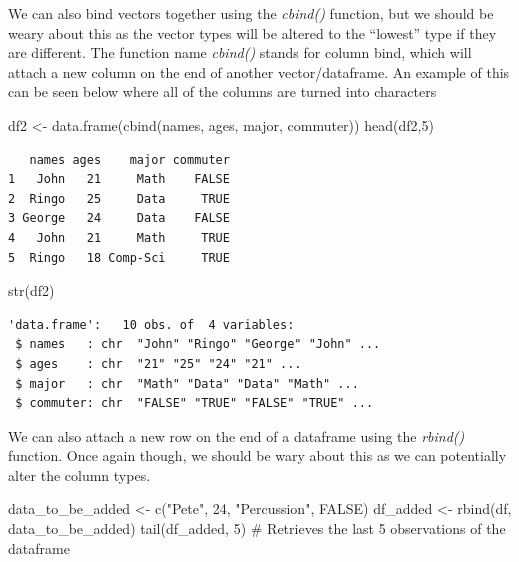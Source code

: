 \documentclass[
  letterpaper,
  DIV=11,
  numbers=noendperiod]{scrreprt}
\newenvironment{Shaded}{\begin{snugshade}}{\end{snugshade}}
\newcommand{\CommentTok}[1]{\textcolor[rgb]{0.37,0.37,0.37}{#1}}
\newcommand{\ConstantTok}[1]{\textcolor[rgb]{0.56,0.35,0.01}{#1}}
\newcommand{\DecValTok}[1]{\textcolor[rgb]{0.68,0.00,0.00}{#1}}
\newcommand{\FunctionTok}[1]{\textcolor[rgb]{0.28,0.35,0.67}{#1}}
\newcommand{\NormalTok}[1]{\textcolor[rgb]{0.00,0.23,0.31}{#1}}
\newcommand{\OtherTok}[1]{\textcolor[rgb]{0.00,0.23,0.31}{#1}}
\newcommand{\StringTok}[1]{\textcolor[rgb]{0.13,0.47,0.30}{#1}}
\begin{document}
We can also bind vectors together using the \emph{cbind()} function, but
we should be weary about this as the vector types will be altered to the
``lowest'' type if they are different. The function name \emph{cbind()}
stands for column bind, which will attach a new column on the end of
another vector/dataframe. An example of this can be seen below where all
of the columns are turned into characters

\begin{Shaded}
\begin{Highlighting}[]
\NormalTok{df2 }\OtherTok{\textless{}{-}} \FunctionTok{data.frame}\NormalTok{(}\FunctionTok{cbind}\NormalTok{(names, ages, major, commuter))}
\FunctionTok{head}\NormalTok{(df2,}\DecValTok{5}\NormalTok{)}
\end{Highlighting}
\end{Shaded}

\begin{verbatim}
   names ages    major commuter
1   John   21     Math    FALSE
2  Ringo   25     Data     TRUE
3 George   24     Data    FALSE
4   John   21     Math     TRUE
5  Ringo   18 Comp-Sci     TRUE
\end{verbatim}

\begin{Shaded}
\begin{Highlighting}[]
\FunctionTok{str}\NormalTok{(df2)}
\end{Highlighting}
\end{Shaded}

\begin{verbatim}
'data.frame':   10 obs. of  4 variables:
 $ names   : chr  "John" "Ringo" "George" "John" ...
 $ ages    : chr  "21" "25" "24" "21" ...
 $ major   : chr  "Math" "Data" "Data" "Math" ...
 $ commuter: chr  "FALSE" "TRUE" "FALSE" "TRUE" ...
\end{verbatim}

We can also attach a new row on the end of a dataframe using the
\emph{rbind()} function. Once again though, we should be wary about this
as we can potentially alter the column types.

\begin{Shaded}
\begin{Highlighting}[]
\NormalTok{data\_to\_be\_added }\OtherTok{\textless{}{-}} \FunctionTok{c}\NormalTok{(}\StringTok{"Pete"}\NormalTok{, }\DecValTok{24}\NormalTok{, }\StringTok{"Percussion"}\NormalTok{, }\ConstantTok{FALSE}\NormalTok{)}
\NormalTok{df\_added }\OtherTok{\textless{}{-}} \FunctionTok{rbind}\NormalTok{(df, data\_to\_be\_added)}
\FunctionTok{tail}\NormalTok{(df\_added, }\DecValTok{5}\NormalTok{) }\CommentTok{\# Retrieves the last 5 observations of the dataframe}
\end{Highlighting}
\end{Shaded}
\end{document}
